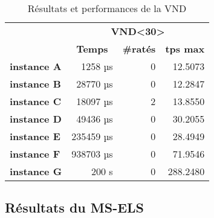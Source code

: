         \begin{table}[H]
            \centering
            \begin{tabular}{l|r|r|r|}
            \cline{2-4}
            \multirow{2}{*}{}                         & \multicolumn{3}{c|}{\textbf{VND\textless30\textgreater}}                                                            \\ \cline{2-4} 
                                                      & \multicolumn{1}{c|}{\textbf{Temps}} & \multicolumn{1}{c|}{\textbf{\#ratés}} & \multicolumn{1}{c|}{\textbf{tps max}} \\ \hline
            \multicolumn{1}{|l|}{\textbf{instance A}} & 1258 µs                             & 0                                     & 12.5073                               \\ \hline
            \multicolumn{1}{|l|}{\textbf{instance B}} & 28770 µs                            & 0                                     & 12.2847                               \\ \hline
            \multicolumn{1}{|l|}{\textbf{instance C}} & 18097 µs                            & 2                                     & 13.8550                               \\ \hline
            \multicolumn{1}{|l|}{\textbf{instance D}} & 49436 µs                            & 0                                     & 30.2055                               \\ \hline
            \multicolumn{1}{|l|}{\textbf{instance E}} & 235459 µs                           & 0                                     & 28.4949                               \\ \hline
            \multicolumn{1}{|l|}{\textbf{instance F}} & 938703 µs                           & 0                                     & 71.9546                               \\ \hline
            \multicolumn{1}{|l|}{\textbf{instance G}} & 200 s                               & 0                                     & 288.2480                                       \\ \hline
            \end{tabular}
            \caption{Résultats et performances de la VND}
            \label{tab:vnd-perf}
        \end{table}

    	\subsection{Résultats du MS-ELS}
    	
